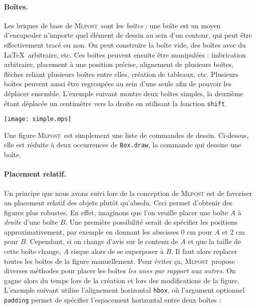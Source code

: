 \documentclass[twoside]{studia-Hermann}
\newcommand{\mlpost}{\textsc{Mlpost}}
\begin{document}
\paragraph{Boîtes.}
Les briques de base de \mlpost\ sont les \textit{boîtes} : une boîte
est un moyen d'encapsuler n'importe quel élément de dessin au sein
d'un contour, qui peut être effectivement tracé ou non. On peut
construire la boîte vide, des boîtes avec du \LaTeX\ arbitraire, etc.
Ces boîtes peuvent ensuite être manipulées : imbrication arbitraire,
placement à une position précise, alignement de plusieurs boîtes,
flèches reliant plusieurs boîtes entre elles, création de tableaux,
etc. Plusieurs boîtes peuvent aussi être regroupées au sein d'une
seule afin de pouvoir les déplacer ensemble.  L'exemple suivant montre
deux boîtes simples, la deuxième étant déplacée un centimètre vers la
droite en utilisant la fonction \verb|shift|.

\medskip
\begin{minipage}{0.18\linewidth}
  \texttt{[image: simple.mps]}
\end{minipage}
\begin{minipage}{0.8\linewidth}
\small\begin{ocaml}
\end{ocaml}
\end{minipage}

\medskip\noindent
Une figure \mlpost\ est simplement une liste de commandes de
dessin. Ci-dessus, elle est réduite à deux occurrences de
\texttt{Box.draw}, la commande qui dessine une boîte.

\paragraph{Placement relatif.}
Un principe que nous avons suivi lors de la conception de \mlpost{}
est de favoriser un placement relatif des objets plutôt qu'absolu.
Ceci permet d'obtenir des figures plus robustes. En effet, imaginons
que l'on veuille placer une boîte $A$ à \emph{droite} d'une boîte $B$.
Une première possibilité serait de spécifier les positions
approximativement, par exemple en donnant les abscisses 0 cm pour $A$
et 2 cm pour $B$. Cependant, si on change d'avis sur le contenu de
$A$ et que la taille de cette boîte change, $A$ risque alors de se
superposer à $B$. Il faut alors replacer toutes les boîtes de la
figure manuellement. Pour éviter ça, \mlpost\ propose diverses
méthodes pour placer les boîtes \emph{les unes par rapport aux
  autres}. On gagne alors du temps lors de la création et lors des
modifications de la figure.  L'exemple suivant utilise l'alignement
horizontal \verb|hbox|, où l'argument optionnel \texttt{padding}
permet de spécifier l'espacement horizontal entre deux boîtes :
\end{document}
